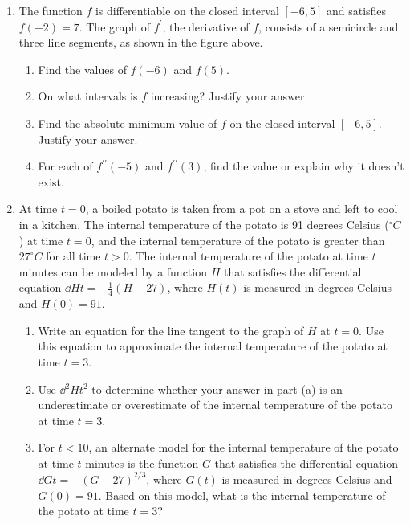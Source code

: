 \begin{enumerate}
	\item The function $f$ is differentiable on the closed interval $[-6,5]$ and satisfies $f(-2)=7$.
		The graph of $f^\prime$, the derivative of $f$, consists of a semicircle and three line segments, as shown in the figure above.
		\begin{enumerate}
			\item Find the values of $f(-6)$ and $f(5)$.
			\item On what intervals is $f$ increasing?
				Justify your answer.
			\item Find the absolute minimum value of $f$ on the closed interval $[-6,5]$.
				Justify your answer.
			\item For each of $f^{\prime\prime}(-5)$ and $f^{\prime\prime}(3)$, find the value or explain why it doesn't exist.
		\end{enumerate}
	
	\item At time $t=0$, a boiled potato is taken from a pot on a stove and left to cool in a kitchen.
		The internal temperature of the potato is 91 degrees Celsius ($^\circ C$) at time $t=0$, and the internal temperature of the potato is greater than $27^\circ C$ for all time $t > 0$.
		The internal temperature of the potato at time $t$ minutes can be modeled by a function $H$ that satisfies the differential equation $\dd{H}{t} = -\frac{1}{4}(H-27)$, where $H(t)$ is measured in degrees Celsius and $H(0)=91$.
		\begin{enumerate}
			\item Write an equation for the line tangent to the graph of $H$ at $t=0$.
				Use this equation to approximate the internal temperature of the potato at time $t=3$.
			\item Use $\dd{^2H}{t^2}$ to determine whether your answer in part (a) is an underestimate or overestimate of the internal temperature of the potato at time $t=3$.
			\item For $t<10$, an alternate model for the internal temperature of the potato at time $t$ minutes is the function $G$ that satisfies the differential equation $\dd{G}{t} = -(G-27)^{2/3}$, where $G(t)$ is measured in degrees Celsius and $G(0)=91$.
				Based on this model, what is the internal temperature of the potato at time $t=3$?
		\end{enumerate}
	

\end{enumerate}
